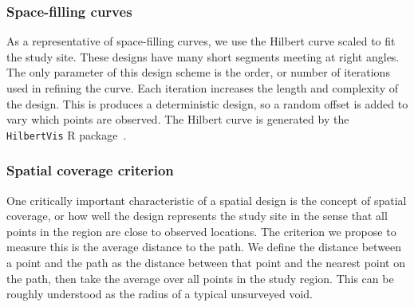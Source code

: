 \documentclass[review]{elsarticle}
\begin{document}
\subsubsection{Space-filling curves}

As a representative of space-filling curves, we use the Hilbert curve scaled
to fit the study site. These designs have many short segments meeting at right
angles. The only parameter of this design scheme is the order, or number of
iterations used in refining the curve. Each iteration increases the length and
complexity of the design. This is produces a deterministic design, so a random
offset is added to vary which points are observed. The Hilbert curve is
generated by the \texttt{HilbertVis} R package~\citep{hilbertvis}.




\subsubsection{Spatial coverage criterion}

One critically important characteristic of a spatial design is the concept of
spatial coverage, or how well the design represents the study site in the sense
that all points in the region are close to observed locations. The criterion we
propose to measure this is the average distance to the path. We define the
distance between a point and the path as the distance between that point and
the nearest point on the path, then take the average over all points in the
study region. This can be roughly understood as the radius of a typical
unsurveyed void.
\end{document}
